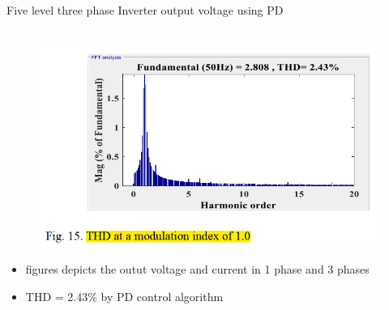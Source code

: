 \documentclass[
	11pt, %
]{beamer}
\begin{document}
\begin{frame}{Five level three phase Inverter output voltage using PD}
\begin{columns}
\begin{column}{0.5\textwidth}
\begin{figure}
			\includegraphics[width=1\linewidth]{PD_THD.png}
		\end{figure}
		\begin{itemize}
			\scriptsize
			\item {figures depicts the outut voltage and current in 1 phase and 3 phases}
			\item {THD = 2.43\% by PD control algorithm}
		\end{itemize}
	\end{column}
  \end{columns}
\end{frame}
\end{document}
